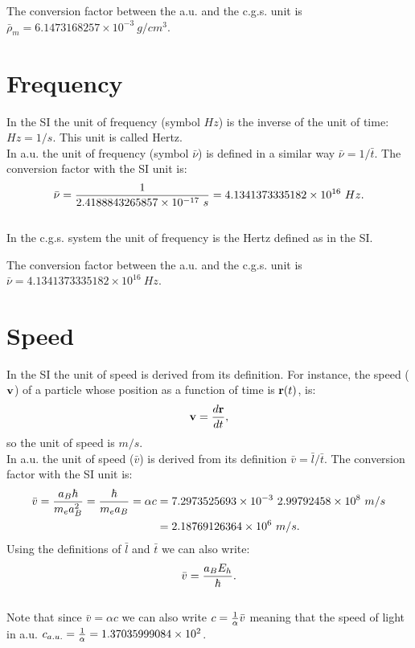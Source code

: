 \documentclass[12pt,a4paper]{article}
\def\cspeed{2.99792458\times 10^{8}}
\def\alphaf{7.2973525693\times 10^{-3}}
\def\bart{2.4188843265857\times 10^{-17}}
\def\barnu{4.1341373335182\times 10^{16}}
\def\barv{2.18769126364\times 10^{6}}
\def\barrhomcgs{6.1473168257\times 10^{-3}}
\def\cspeedau{1.37035999084\times 10^{2}}
\begin{document}
{\color{green} The conversion factor between the a.u. and the c.g.s. unit is
$\bar \rho_m=\barrhomcgs\ g/cm^3$.
}

\newpage
\section{\color{coral}Frequency}

In the SI the unit of frequency (symbol $Hz$) is the inverse
of the unit of time: $Hz=1/s$. This unit is called Hertz.
\\

{\color{web-blue} In a.u. the unit of frequency (symbol $\bar \nu$) is defined
in a similar way $\bar \nu= 1/\bar t$. The conversion factor with the 
SI unit is:
\begin{equation}
\bar \nu = {1 \over \bart\ s}=\barnu\ Hz.
\end{equation}
}
\\

{\color{orange} In the c.g.s. system the unit of frequency is the Hertz 
defined as in the SI.
\\
}

{\color{green} The conversion factor between the a.u. and the c.g.s. unit is
$\bar \nu=\barnu\ Hz$.
\\
}


\newpage
\section{\color{coral}Speed}
In the SI the unit of speed is derived from its definition.
For instance, the speed (${\bf v}$) of a particle 
whose position as a function of time is ${\bf r}(t)$, is:
\begin{equation}
{\bf v}={d{\bf r} \over dt},
\end{equation} 
so the unit of speed is $m/s$.
\\

{\color{web-blue} In a.u. the unit of speed ($\bar v$) is derived 
from its definition $\bar v = \bar l / \bar t$. The conversion factor
with the SI unit is:
\begin{align}
\bar v ={a_B \hbar \over m_e a_B^2}={\hbar \over m_e a_B}=\alpha c&=
 {\alphaf\  \cspeed\ m/s}\nonumber \\ 
&=\barv\ m/s.
\end{align}
Using the definitions of $\bar l$ and $\bar t$ we can also write:
\begin{equation}
\bar v={a_B E_h \over \hbar}.
\end{equation}
\\
Note that since $\bar v= \alpha c$ we can also write 
$c={1\over \alpha} \bar v$ meaning that the speed of light in a.u. 
$c_{a.u.}={1\over\alpha}=\cspeedau$.
}
\\
\end{document}
